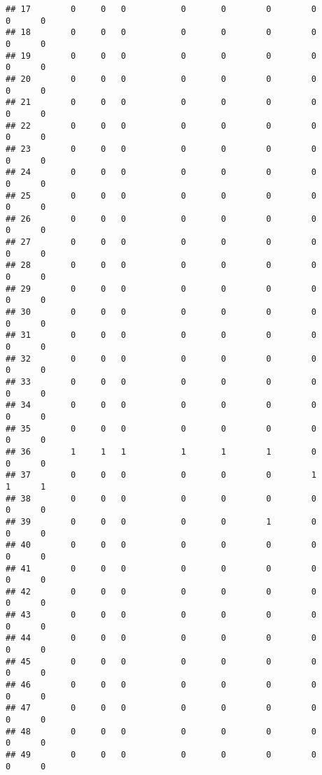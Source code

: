\documentclass[
]{article}
\begin{document}
\begin{verbatim}
## 17        0     0   0           0       0        0        0         0      0
## 18        0     0   0           0       0        0        0         0      0
## 19        0     0   0           0       0        0        0         0      0
## 20        0     0   0           0       0        0        0         0      0
## 21        0     0   0           0       0        0        0         0      0
## 22        0     0   0           0       0        0        0         0      0
## 23        0     0   0           0       0        0        0         0      0
## 24        0     0   0           0       0        0        0         0      0
## 25        0     0   0           0       0        0        0         0      0
## 26        0     0   0           0       0        0        0         0      0
## 27        0     0   0           0       0        0        0         0      0
## 28        0     0   0           0       0        0        0         0      0
## 29        0     0   0           0       0        0        0         0      0
## 30        0     0   0           0       0        0        0         0      0
## 31        0     0   0           0       0        0        0         0      0
## 32        0     0   0           0       0        0        0         0      0
## 33        0     0   0           0       0        0        0         0      0
## 34        0     0   0           0       0        0        0         0      0
## 35        0     0   0           0       0        0        0         0      0
## 36        1     1   1           1       1        1        0         0      0
## 37        0     0   0           0       0        0        1         1      1
## 38        0     0   0           0       0        0        0         0      0
## 39        0     0   0           0       0        1        0         0      0
## 40        0     0   0           0       0        0        0         0      0
## 41        0     0   0           0       0        0        0         0      0
## 42        0     0   0           0       0        0        0         0      0
## 43        0     0   0           0       0        0        0         0      0
## 44        0     0   0           0       0        0        0         0      0
## 45        0     0   0           0       0        0        0         0      0
## 46        0     0   0           0       0        0        0         0      0
## 47        0     0   0           0       0        0        0         0      0
## 48        0     0   0           0       0        0        0         0      0
## 49        0     0   0           0       0        0        0         0      0

\end{verbatim}
\end{document}

